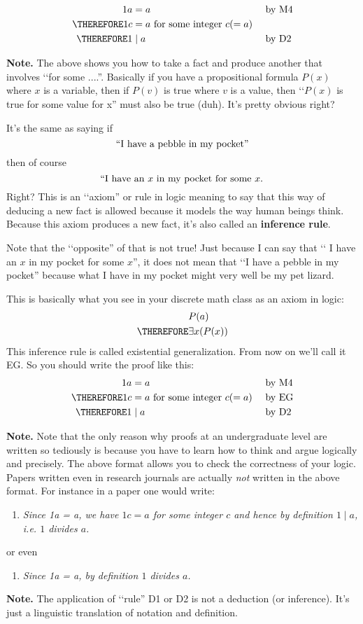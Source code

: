 \begin{align*}
           1 a &= a                                     & & \text{by M4} \\
\THEREFORE 1 c &= a \text{ for some integer $c (= a)$ } & & \\
\THEREFORE 1   &\mid a                                  & & \text{by D2}
\end{align*}

{\bf Note.}
The above shows you how to take a fact and produce another that involves
\lq\lq for some ....''.
Basically if you have a propositional formula 
$P(x)$ where $x$ is a variable, 
then if $P(v)$ is true where $v$ is a value, then
\lq\lq $P(x)$ is true for some value for x'' must also be true (duh).
It's pretty obvious right?

It's the same as saying if 
\[
\text{\lq\lq I have a pebble in my pocket''}
\]
then of course 
\[
\text{ \lq\lq I have an $x$ in my pocket for some $x$. }
\]
Right?
This is an \lq\lq axiom'' or rule in logic meaning to say
that this way of deducing a new fact is allowed because it models
the way human beings think.
Because this axiom produces a new fact, it's also
called an {\bf inference rule}.

Note that the \lq\lq opposite'' of that is not true!
Just because I can say that \lq\lq 
I have an $x$ in my pocket
 for some $x$'',
it does not mean that \lq\lq I have a pebble in my pocket''
because what I have in my pocket might very well be my pet lizard.

This is basically what you see in your discrete math class
as an axiom in logic:
\begin{align*}
           &P(a) \\
\THEREFORE &\exists x (P(x))
\end{align*}
This inference rule is called existential generalization.
From now on we'll call it EG.
So you should write the proof like this:
\begin{align*}
           1 a &= a                                     & & \text{by M4} \\
\THEREFORE 1 c &= a \text{ for some integer $c (= a)$ } & & \text{by EG} \\
\THEREFORE 1   &\mid a                                  & & \text{by D2}
\end{align*}

{\bf Note.}
Note that the only reason why proofs at an undergraduate level are
written so tediously is because you have to learn how to think and
argue logically and precisely.
The above format allows you to check the correctness of your logic.
Papers written even in research journals are actually {\it not} 
written in the above format. 
For instance in a paper one would write:
\begin{enumerate}
\item[]
{\it Since 1a = a, we have $1c = a$ for some integer $c$
and hence by definition $1 \mid a$, i.e. $1$ divides $a$.}
\end{enumerate}
or even
\begin{enumerate}
\item[] {\it Since 1a = a, by definition $1$ divides $a$.}
\end{enumerate}

{\bf Note.}
The application of \lq\lq rule'' D1 or D2 is not a deduction
(or inference).
It's just a linguistic translation of notation and definition.
